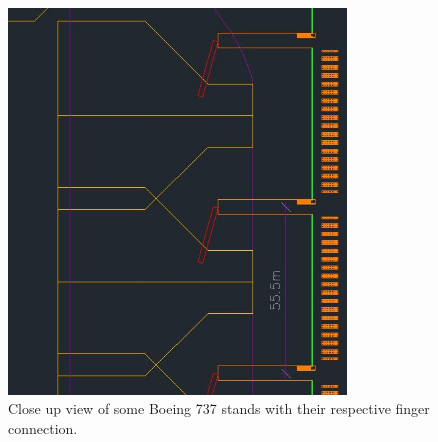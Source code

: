 	\begin{figure}[H]
		\centering
		\includegraphics[clip, trim=0cm 0cm 0cm 0cm, angle=90, width=0.8\textwidth]{./images/serviceway/fingercloseup}
		\caption{Close up view of some Boeing 737 stands with their respective finger connection.} %
		\label{} %
	\end{figure} 